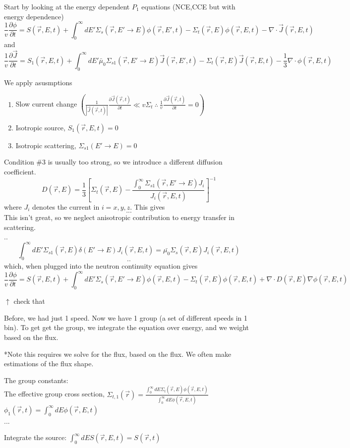 \documentclass{report}
\newcommand{\p}{\partial}
\newcommand{\Xs}{\Sigma}
\newcommand{\Oov}{\frac{1}{v}}
\newcommand{\pos}{\vec{r}}
\newcommand{\cur}{\vec{J}}
\newcommand{\intzi}{\int_0^{\infty}}
\newcommand{\rt}{(\pos,t)}
\newcommand{\rE}{(\pos,E)}
\newcommand{\rEt}{(\pos,E,t)}
\newcommand{\rEtprime}{(\pos,E',t)}
\begin{document}
Start by looking at the energy dependent $P_1$ equations (NCE,CCE but with energy dependence)
$$ \Oov \frac{\p \phi}{\p t} = S\rEt + \intzi dE' \Xs_s(\pos,E' \rightarrow E)\phi\rEtprime - \Xs_t\rE\phi\rEt - \nabla \cdot \cur\rEt$$
and
$$ \Oov \frac{\p \cur}{\p t} = S_1\rEt + \intzi dE' \bar{\mu}_0\Xs_{s1}(\pos,E' \rightarrow E)\cur\rEtprime - \Xs_t\rE\cur\rEt - \frac{1}{3}\nabla \cdot \phi\rEt$$

We apply asusmptions
\begin{enumerate}
    \item Slow current change $\left(\frac{1}{|\cur\rt|}\frac{\p \cur\rt}{\p t} \ll v\Xs_t \ \therefore\ \frac{1}{v}\frac{\p \cur\rt}{\p t} = 0 \right)$
    \item Isotropic source, $S_1\rEt=0$
    \item Isotropic scattering, $\Xs_{s1}(E' \rightarrow E) = 0$
\end{enumerate}

Condition \#3 is usually too strong, so we introduce a different diffusion coefficient.
$$ D\rE = \frac{1}{3}\left[\Xs_t\rE - \frac{\intzi \Xs_{s1}(\pos,E' \rightarrow E) J_i}{J_i\rEt }\right]^{-1}$$
where $J_i$ denotes the current in $i = x,y,z$. This gives
$$...$$
This isn't great, so we neglect anisotropic contribution to energy transfer in scattering.\\
..\\
$$\intzi dE' \Xs_{s1}\rE \delta(E' \rightarrow E) J_i\rEt = \bar{\mu_0}\Xs_s\rE J_i\rEt$$
$$..$$
which, when plugged into the neutron continuity equation gives 
$$\Oov \frac{\p \phi}{\p t} = S\rEt + \intzi dE' \Xs_s(\pos,E' \rightarrow E) \phi\rEt - \Xs_t\rE \phi\rEt + \nabla \cdot D\rE \nabla \phi\rEt$$ 

$\uparrow$ check that

Before, we had just 1 speed. Now we have 1 group (a set of different speeds in 1 bin). To get get the group, we integrate the equation over energy, and we weight based on the flux. 

*Note this requires we solve for the flux, based on the flux. We often make estimations of the flux shape.

The group constants:\\
The effective group cross section, $\Xs_{t,1}(\pos) = \frac{\intzi dE \Xs_t\rE \phi\rEt}{\intzi dE \phi\rEt}$
$\phi_1\rt = \intzi dE \phi\rEt$\\
...

Integrate the source:
$\intzi dE S\rEt = S\rt$
\end{document}
